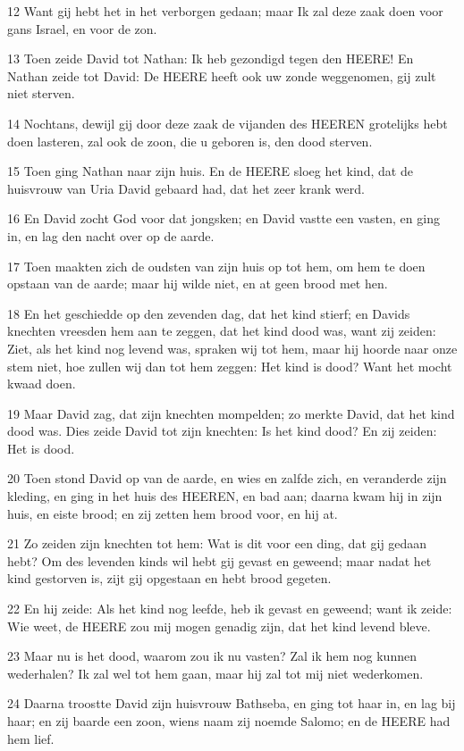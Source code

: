 \par 12 Want gij hebt het in het verborgen gedaan; maar Ik zal deze zaak doen voor gans Israel, en voor de zon.
\par 13 Toen zeide David tot Nathan: Ik heb gezondigd tegen den HEERE! En Nathan zeide tot David: De HEERE heeft ook uw zonde weggenomen, gij zult niet sterven.
\par 14 Nochtans, dewijl gij door deze zaak de vijanden des HEEREN grotelijks hebt doen lasteren, zal ook de zoon, die u geboren is, den dood sterven.
\par 15 Toen ging Nathan naar zijn huis. En de HEERE sloeg het kind, dat de huisvrouw van Uria David gebaard had, dat het zeer krank werd.
\par 16 En David zocht God voor dat jongsken; en David vastte een vasten, en ging in, en lag den nacht over op de aarde.
\par 17 Toen maakten zich de oudsten van zijn huis op tot hem, om hem te doen opstaan van de aarde; maar hij wilde niet, en at geen brood met hen.
\par 18 En het geschiedde op den zevenden dag, dat het kind stierf; en Davids knechten vreesden hem aan te zeggen, dat het kind dood was, want zij zeiden: Ziet, als het kind nog levend was, spraken wij tot hem, maar hij hoorde naar onze stem niet, hoe zullen wij dan tot hem zeggen: Het kind is dood? Want het mocht kwaad doen.
\par 19 Maar David zag, dat zijn knechten mompelden; zo merkte David, dat het kind dood was. Dies zeide David tot zijn knechten: Is het kind dood? En zij zeiden: Het is dood.
\par 20 Toen stond David op van de aarde, en wies en zalfde zich, en veranderde zijn kleding, en ging in het huis des HEEREN, en bad aan; daarna kwam hij in zijn huis, en eiste brood; en zij zetten hem brood voor, en hij at.
\par 21 Zo zeiden zijn knechten tot hem: Wat is dit voor een ding, dat gij gedaan hebt? Om des levenden kinds wil hebt gij gevast en geweend; maar nadat het kind gestorven is, zijt gij opgestaan en hebt brood gegeten.
\par 22 En hij zeide: Als het kind nog leefde, heb ik gevast en geweend; want ik zeide: Wie weet, de HEERE zou mij mogen genadig zijn, dat het kind levend bleve.
\par 23 Maar nu is het dood, waarom zou ik nu vasten? Zal ik hem nog kunnen wederhalen? Ik zal wel tot hem gaan, maar hij zal tot mij niet wederkomen.
\par 24 Daarna troostte David zijn huisvrouw Bathseba, en ging tot haar in, en lag bij haar; en zij baarde een zoon, wiens naam zij noemde Salomo; en de HEERE had hem lief.
